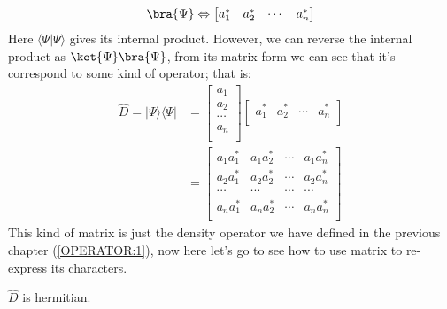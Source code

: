 \begin{equation}\label{}
\bra{\Psi} \Leftrightarrow \begin{bmatrix}
                             a_{1}^{*} & a_{2}^{*} & \cdots & a_{n}^{*} \\
                           \end{bmatrix}
\end{equation}
Here $\langle\Psi|\Psi\rangle$ gives its internal product. However,
we can reverse the internal product as $\ket{\Psi}\bra{\Psi}$, from
its matrix form we can see that it's correspond to some kind of
operator; that is:
\begin{align}\label{REPRESENTATIONeq:10}
\hat{D} = |\Psi\rangle\langle\Psi| &=
\begin{bmatrix}
a_{1} \\
a_{2} \\
\cdots   \\
a_{n} \\
\end{bmatrix}
\begin{bmatrix}
a_{1}^{*} & a_{2}^{*} & \cdots & a_{n}^{*} \\
\end{bmatrix} \nonumber \\
&=
\begin{bmatrix}
a_{1}a_{1}^{*} & a_{1}a_{2}^{*} & \cdots & a_{1}a_{n}^{*} \\
a_{2}a_{1}^{*} & a_{2}a_{2}^{*} & \cdots & a_{2}a_{n}^{*} \\
\cdots         & \cdots         & \cdots & \cdots         \\
a_{n}a_{1}^{*} & a_{n}a_{2}^{*} & \cdots & a_{n}a_{n}^{*} \\
\end{bmatrix}
\end{align}
This kind of matrix is just the density operator we have defined in
the previous chapter (\ref{OPERATOR:1}), now here let's go to see
how to use matrix to re-express its characters.

\begin{theorem}\label{}
$\hat{D}$ is hermitian.
\end{theorem}

